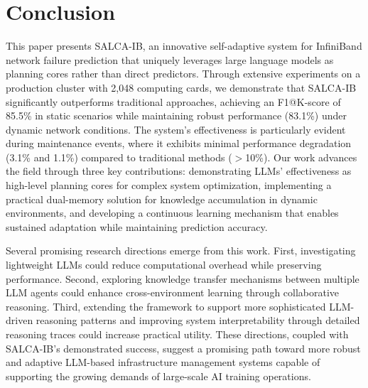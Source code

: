 \documentclass[conference]{IEEEtran}
\begin{document}
\section{Conclusion}

This paper presents SALCA-IB, an innovative self-adaptive system for InfiniBand network failure prediction that uniquely leverages large language models as planning cores rather than direct predictors. Through extensive experiments on a production cluster with 2,048 computing cards, we demonstrate that SALCA-IB significantly outperforms traditional approaches, achieving an F1@K-score of 85.5\% in static scenarios while maintaining robust performance (83.1\%) under dynamic network conditions. The system's effectiveness is particularly evident during maintenance events, where it exhibits minimal performance degradation (3.1\% and 1.1\%) compared to traditional methods ($>$10\%). Our work advances the field through three key contributions: demonstrating LLMs' effectiveness as high-level planning cores for complex system optimization, implementing a practical dual-memory solution for knowledge accumulation in dynamic environments, and developing a continuous learning mechanism that enables sustained adaptation while maintaining prediction accuracy.

Several promising research directions emerge from this work. First, investigating lightweight LLMs could reduce computational overhead while preserving performance. Second, exploring knowledge transfer mechanisms between multiple LLM agents could enhance cross-environment learning through collaborative reasoning. Third, extending the framework to support more sophisticated LLM-driven reasoning patterns and improving system interpretability through detailed reasoning traces could increase practical utility. These directions, coupled with SALCA-IB's demonstrated success, suggest a promising path toward more robust and adaptive LLM-based infrastructure management systems capable of supporting the growing demands of large-scale AI training operations.
\end{document}
